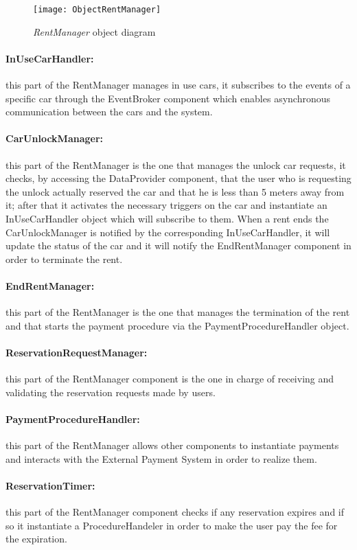 \begin{figure}[h!]
	\centering
	\texttt{[image: ObjectRentManager]}
	\caption{
		\label{fig:rentObjectDiagram} 
		\emph{RentManager} object diagram
	}
\end{figure}

\paragraph{InUseCarHandler:} this part of the RentManager manages in use cars, it subscribes to the events of a specific car through the EventBroker component which enables asynchronous communication between the cars and the system.
\paragraph{CarUnlockManager:} this part of the RentManager is the one that manages the unlock car requests, it checks, by accessing the DataProvider component, that the user who is requesting the unlock actually reserved the car and that he is less than 5 meters away from it; after that it activates the necessary triggers on the car and instantiate an InUseCarHandler object which will subscribe to them. When a rent ends the CarUnlockManager is notified by the corresponding InUseCarHandler, it will update the status of the car and it will notify the EndRentManager component in order to terminate the rent.
\paragraph{EndRentManager:} this part of the RentManager is the one that manages the termination of the rent and that starts the payment procedure via the \mbox{PaymentProcedureHandler} object.
\paragraph{ReservationRequestManager:} this part of the RentManager component is the one in charge of receiving and validating the reservation requests made by users.
\paragraph{PaymentProcedureHandler:} this part of the RentManager allows other components to instantiate payments and interacts with the External Payment System in order to realize them.
\paragraph{ReservationTimer:} this part of the RentManager component checks if any reservation expires and if so it instantiate a ProcedureHandeler in order to make the user pay the fee for the expiration.
